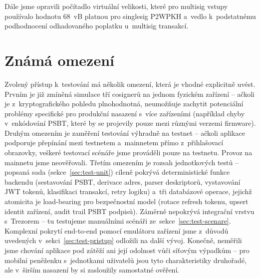 Dále jsme opravili počítadlo virtuální velikosti, které pro multisig vstupy
používalo hodnotu 68~vB platnou pro singlesig P2WPKH a~vedlo k~podstatnému
podhodnocení odhadovaného poplatku u~multisig transakcí.

\section{Známá omezení}
\label{sec:test-omezeni}

Zvolený přístup k~testování má několik omezení, která je vhodné explicitně
uvést. Prvním je již zmíněná simulace tří cosignerů na jednom fyzickém
zařízení -- ačkoli je z~kryptografického pohledu plnohodnotná, neumožňuje
zachytit potenciální problémy specifické pro produkční nasazení s~více
zařízeními (například chyby v~enkódování PSBT, které by se projevily pouze
mezi různými verzemi firmware). Druhým omezením je zaměření testování výhradně na testnet -- ačkoli
aplikace podporuje přepínání mezi testnetem a~mainnetem přímo
z~přihlašovací obrazovky, veškeré testovací scénáře jsme prováděli pouze
na testnetu. Provoz na mainnetu jsme neověřovali.
Třetím omezením je rozsah jednotkových testů -- popsaná sada
(sekce~\ref{sec:test-unit}) cíleně pokrývá deterministické funkce
backendu (sestavování PSBT, derivace adres, parser deskriptorů,
vystavování JWT tokenů, klasifikaci transakcí, retry logiku) a~tři
databázové operace, jejichž atomicita je load-bearing pro
bezpečnostní model (rotace refresh tokenu, upsert identit zařízení,
audit trail PSBT podpisů). Záměrně nepokrývá integrační vrstvu s~Trezorem -- tu
testujeme manuálními scénáři ze~sekce~\ref{sec:test-scenare}.
Komplexní pokrytí end-to-end pomocí emulátoru zařízení jsme z~důvodů
uvedených v~sekci~\ref{sec:test-pristup} odložili na další vývoj.
Konečně, neměřili jsme chování aplikace pod zátěží
ani její odolnost vůči síťovým výpadkům -- pro mobilní peněženku s~jednotkami
uživatelů jsou tyto charakteristiky druhořadé, ale v~širším nasazení by
si zasloužily samostatné ověření.
